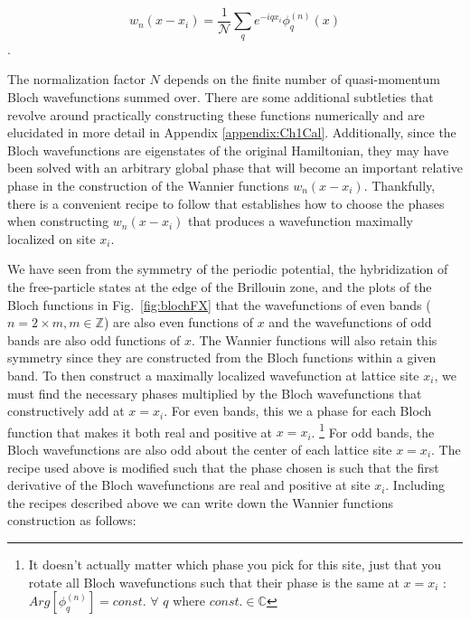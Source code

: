 \begin{equation}
w_n(x-x_i) = \frac{1}{\mathcal{N}} \sum_q e^{-i q x_i} \phi_q^{(n)} (x)
\label{eqn:wnfx}
\end{equation}.

The normalization factor $N$ depends on the finite number of quasi-momentum Bloch wavefunctions summed over. There are some additional subtleties that revolve around practically constructing these functions numerically and are elucidated in more detail in Appendix \ref{appendix:Ch1Cal}. Additionally, since the Bloch wavefunctions are eigenstates of the original Hamiltonian, they may have been solved with an arbitrary global phase that will become an important relative phase in the construction of the Wannier functions $w_n(x-x_i)$.  Thankfully, there is a convenient recipe to follow that establishes how to choose the phases when constructing $w_n(x-x_i)$ that produces a wavefunction maximally localized on site $x_i$.

We have seen from the symmetry of the periodic potential, the hybridization of the free-particle states at the edge of the Brillouin zone, and the plots of the Bloch functions in Fig.~\ref{fig:blochFX} that the wavefunctions of even bands ($ n = 2\times m, m\in  \mathbb{Z}$) are also even functions of $x$ and the wavefunctions of odd bands are also odd functions of $x$. The Wannier functions will also retain this symmetry since they are constructed from the Bloch functions within a given band. To then construct a maximally localized wavefunction at lattice site $x_i$, we must find the necessary phases multiplied by the Bloch wavefunctions that constructively add at $x=x_i$. For even bands, this we a phase for each Bloch function that makes it both real and positive at $x=x_i$. \footnote{It doesn't actually matter which phase you pick for this site, just that you rotate all Bloch wavefunctions such that their phase is the same at $x=x_i$ : $Arg \left [  \phi_q^{(n)} \right ] = const.$ $\forall$ $q$ where $const. \in \mathbb{C}$} For odd bands, the Bloch wavefunctions are also odd about the center of each lattice site $x=x_i$. The recipe used above is modified such that the phase chosen is such that the first derivative of the Bloch wavefunctions are real and positive at site $x_i$. Including the recipes described above we can write down the Wannier functions construction as follows:


